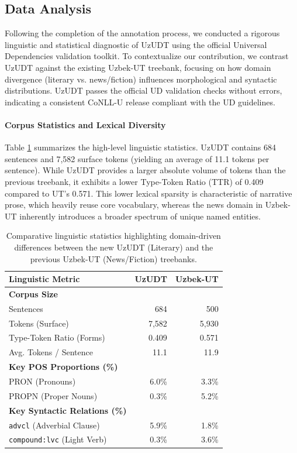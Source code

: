 \documentclass[10pt, a4paper]{article}
\begin{document}
\subsection{Data Analysis}
\label{sec:data_analysis}

Following the completion of the annotation process, we conducted a rigorous linguistic and statistical diagnostic of UzUDT using the official Universal Dependencies validation toolkit. To contextualize our contribution, we contrast UzUDT against the existing Uzbek-UT treebank, focusing on how domain divergence (literary vs. news/fiction) influences morphological and syntactic distributions. UzUDT passes the official UD validation checks without errors, indicating a consistent CoNLL-U release compliant with the UD guidelines.

\paragraph{Corpus Statistics and Lexical Diversity}
Table \ref{tab:main_corpus_stats} summarizes the high-level linguistic statistics. UzUDT contains 684 sentences and 7,582 surface tokens (yielding an average of 11.1 tokens per sentence). While UzUDT provides a larger absolute volume of tokens than the previous treebank, it exhibits a lower Type-Token Ratio (TTR)\cite{Richards_1987} of 0.409 compared to UT's 0.571. This lower lexical sparsity is characteristic of narrative prose, which heavily reuse core vocabulary, whereas the news domain in Uzbek-UT inherently introduces a broader spectrum of unique named entities.

\begin{table}[ht]
\centering
\small
\begin{tabular}{lrr}
\toprule
\textbf{Linguistic Metric} & \textbf{UzUDT} & \textbf{Uzbek-UT} \\
\midrule
\textbf{Corpus Size} & & \\
Sentences & 684 & 500 \\
Tokens (Surface) & 7,582 & 5,930 \\
Type-Token Ratio (Forms) & 0.409 & 0.571 \\
Avg. Tokens / Sentence & 11.1 & 11.9 \\
\midrule
\textbf{Key POS Proportions (\%)} & & \\
PRON (Pronouns) & 6.0\% & 3.3\% \\
PROPN (Proper Nouns) & 0.3\% & 5.2\% \\
\midrule
\textbf{Key Syntactic Relations (\%)} & & \\
\texttt{advcl} (Adverbial Clause) & 5.9\% & 1.8\% \\
\texttt{compound:lvc} (Light Verb) & 0.3\% & 3.6\% \\
\bottomrule
\end{tabular}
\caption{Comparative linguistic statistics highlighting domain-driven differences between the new UzUDT (Literary) and the previous Uzbek-UT (News/Fiction) treebanks.}
\label{tab:main_corpus_stats}
\end{table}
\end{document}
